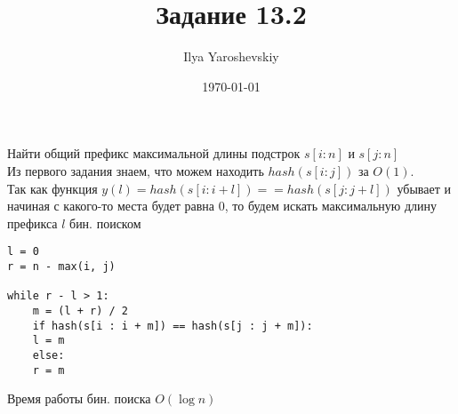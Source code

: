 \documentclass{article}
\author{Ilya Yaroshevskiy}
\date{\today}
\title{Задание 13.2}
\begin{document}
\maketitle
Найти общий префикс максимальной длины подстрок \(s[i : n]\) и \(s[j : n]\) \\

Из первого задания знаем, что можем находить \(hash(s[i:j])\) за \(O(1)\). \\
Так как функция \(y(l) = hash(s[i : i + l]) == hash(s[j : j + l])\) убывает и
начиная с какого-то места будет равна \(0\), то будем искать
максимальную длину префикса \(l\) бин. поиском

\begin{verbatim}
l = 0
r = n - max(i, j)

while r - l > 1:
    m = (l + r) / 2
    if hash(s[i : i + m]) == hash(s[j : j + m]):
	l = m
    else:
	r = m
\end{verbatim}

Время работы бин. поиска \(O(\log{n})\)
\end{document}
